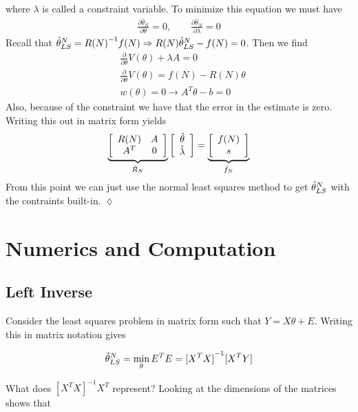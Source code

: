 \begin{example}
where $\lambda$ is called a constraint variable.
To minimize this equation we must have
\begin{align*}
\frac{\partial\hat{\theta}_N}{\partial\theta}=0, \qquad \frac{\partial\hat{\theta}_N}{\partial\lambda}=0
\end{align*}
Recall that $\hat{\theta}_{LS}^N={R(N)}^{-1}f(N)\Rightarrow R(N)\hat{\theta}_{LS}^N-f(N)=0$.
Then we find
\begin{align*}
&\frac{\partial}{\partial\theta}V(\theta) +\lambda A = 0 \\
&\frac{\partial}{\partial\theta}V(\theta) = f(N)-R(N)\theta \\
&w(\theta)=0\rightarrow A^T\theta-b=0
\end{align*}
Also, because of the constraint we have that the error in the estimate is zero.
Writing this out in matrix form yields
\begin{align*}
\underbrace{\left[\begin{array}{c c} R(N) & A \\ A^T & 0 \end{array}\right]}_{\tilde{R}_N} \left[\begin{array}{c} \hat{\theta} \\ \hat{\lambda} \end{array}\right] = \underbrace{\left[\begin{array}{c} f(N) \\ s \end{array}\right]}_{\tilde{f}_N}
\end{align*}
From this point we can just use the normal least squares method to get $\hat{\theta}_{LS}^N$ with the contraints built-in.
$\lozenge$
\end{example}

\section{Numerics and Computation}
\subsection{Left Inverse}
Consider the least squares problem in matrix form such that $Y=X\theta+E$.
Writing this in matrix notation gives

\begin{equation*}
\hat{\theta}_{LS}^N = \min_\theta E^T E = {[X^T X]}^{-1}[X^T Y]
\end{equation*}

What does ${[X^T X]}^{-1}X^T$ represent? Looking at the dimensions of the matrices shows that

